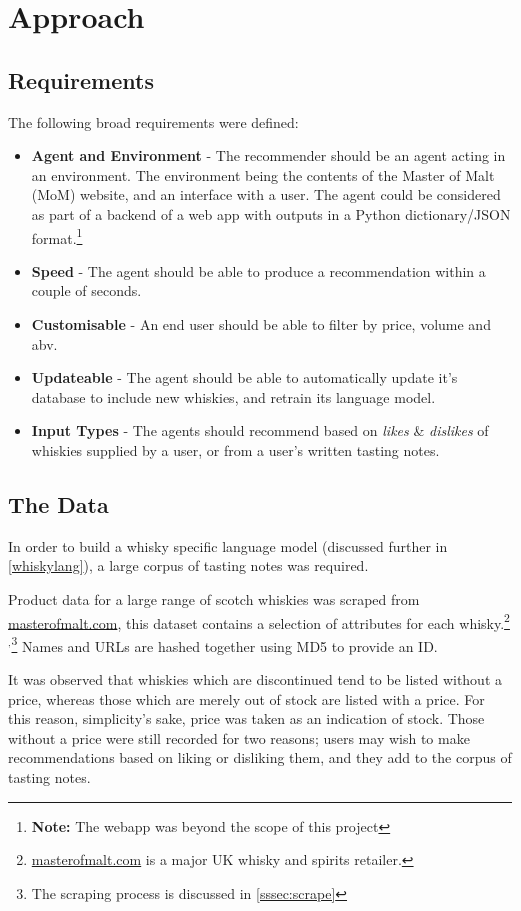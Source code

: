 \section{Approach}\label{sec:approach}
\subsection{Requirements}
The following broad requirements were defined:
\begin{itemize}
    \item \textbf{Agent and Environment} - The recommender should be an agent acting in an environment. 
    The environment being the contents of the Master of Malt (MoM) website, and an interface with a user.
    The agent could be considered as part of a backend of a web app with outputs in a Python dictionary/JSON
    format.\footnote{\textbf{Note:} The webapp was beyond the scope of this project}
    \item \textbf{Speed} - The agent should be able to produce a recommendation
    within a couple of seconds.
    \item \textbf{Customisable} - An end user should be able to filter by price,
    volume and abv.
    \item \textbf{Updateable} - The agent should be able to automatically update
    it's database to include new whiskies, and retrain its language model.
    \item \textbf{Input Types} - The agents should recommend based on \emph{likes} 
    \& \emph{dislikes} of whiskies supplied by a user, or from a user's written 
    tasting notes.
\end{itemize}

\subsection{The Data}
In order to build a whisky specific language model (discussed further in
\autoref{whiskylang}), a large corpus of tasting notes was required.

Product data for a large range of scotch whiskies was scraped from
\href{http://masterofmalt.com/}{masterofmalt.com}, this dataset contains a selection of attributes for each 
whisky.\footnote{\href{http://masterofmalt.com/}{masterofmalt.com} is a major UK whisky and spirits retailer.}$^{,}$\footnote{The scraping process is discussed in \autoref{sssec:scrape}}
Names and URLs are hashed together using MD5 to provide an ID.

It was observed that whiskies which are discontinued tend to be listed
without a price, whereas those which are merely out of stock are listed with a
price.  For this reason, simplicity's sake, price was taken as an
indication of stock.  Those without a price
were still recorded for two reasons; users may wish to make recommendations
based on liking or disliking them, and they add to the corpus of tasting notes.

